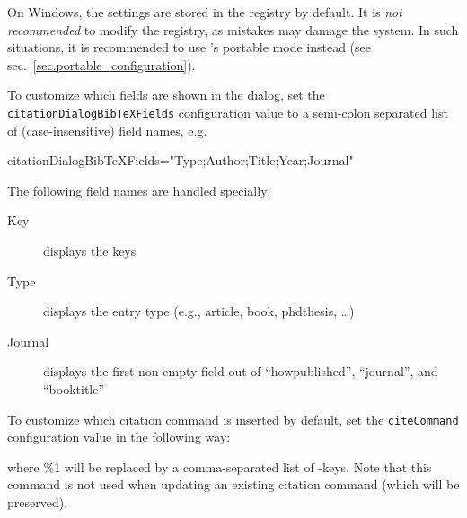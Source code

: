 \begin{OSWindows}
On Windows, the settings are stored in the registry by default. It is \emph{not recommended} to modify the registry, as mistakes may damage the system. In such situations, it is recommended to use {\Tw}'s portable mode instead (see sec.~\ref{sec.portable_configuration}).
\end{OSWindows}

To customize which {\BibTeX} fields are shown in the dialog, set the \verb|citationDialogBibTeXFields| configuration value to a semi-colon separated list of (case-insensitive) {\BibTeX} field names, e.g.
\begin{verbExample}
citationDialogBibTeXFields="Type;Author;Title;Year;Journal"
\end{verbExample}
The following field names are handled specially:
\begin{description}
\item[Key] displays the {\BibTeX} keys
\item[Type] displays the entry type (e.g., article, book, phdthesis, \dots)
\item[Journal] displays the first non-empty field out of ``howpublished'', ``journal'', and ``booktitle''
\end{description}

To customize which citation command is inserted by default, set the \verb|citeCommand| configuration value in the following way:
where \%1 will be replaced by a comma-separated list of {\BibTeX}-keys. Note that this command is not used when updating an existing citation command (which will be preserved).